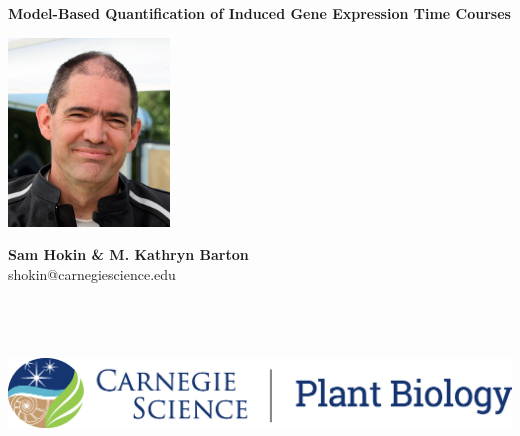 \documentclass[aspb,landscape]{a0poster}
\begin{document}


{
  \color{CarnegiePriBlue} \VeryHuge
  \textbf{Model-Based Quantification of Induced Gene Expression Time Courses}    %
  \vspace{5mm}
}

\begin{minipage}[m]{0.08\linewidth}
  \includegraphics[height=50mm]{sam-bfr-smiling-crop.jpg} %
\end{minipage}
\begin{minipage}[m]{0.40\linewidth}                      %
  \color{Black}
  \Huge \textbf{Sam Hokin \& M. Kathryn Barton} \\
  \Large shokin@carnegiescience.edu
\end{minipage}
\hfill
\begin{minipage}[m]{0.40\linewidth}                      %
  \hfill
  \includegraphics[height=50mm]{CS_plantbio_logo_horz.eps} %
\end{minipage}
\end{document}
